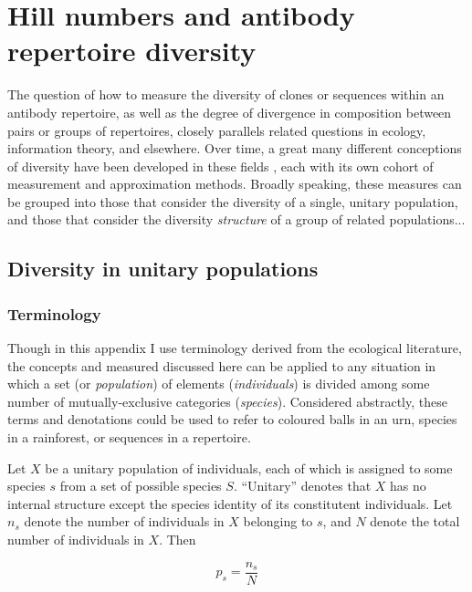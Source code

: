 \chapter{Hill numbers and antibody repertoire diversity}
\label{app:diversity}

\normalsize

The question of how to measure the diversity of clones or sequences within an antibody repertoire, as well as the degree of divergence in composition between pairs or groups of repertoires, closely parallels related questions in ecology, information theory, and elsewhere. Over time, a great many different conceptions of diversity have been developed in these fields \citep{peet1974diversity}, each with its own cohort of measurement and approximation methods. Broadly speaking, these measures can be grouped into those that consider the diversity of a single, unitary population, and those that consider the diversity \textit{structure} of a group of related populations...

\section{Diversity in unitary populations}
\label{sec:diversity-unitary}

\subsection{Terminology}
\label{sec:diversity-unitary-terminology}

Though in this appendix I use terminology derived from the ecological literature, the concepts and measured discussed here can be applied to any situation in which a set (or \textit{population}) of elements (\textit{individuals}) is divided among some number of mutually-exclusive categories (\textit{species}). Considered abstractly, these terms and denotations could be used to refer to coloured balls in an urn, species in a rainforest, or sequences in a repertoire.

Let $X$ be a unitary population of individuals, each of which is assigned to some species $s$ from a set of possible species $S$. ``Unitary'' denotes that $X$ has no internal structure except the species identity of its constitutent individuals. Let $n_s$ denote the number of individuals in $X$ belonging to $s$, and $N$ denote the total number of individuals in $X$. Then 

\begin{equation}
p_s = \frac{n_s}{N}
\label{eq:species_proportion}
\end{equation}

